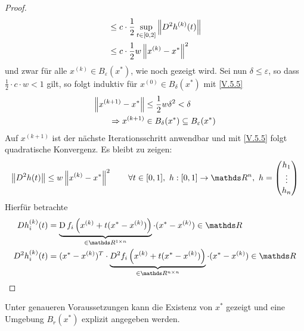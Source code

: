 \begin{proof}
\begin{align}
    &\leq c\cdot \frac{1}{2} \sup_{t\in[0,2]} \nn[D^2h^{(k)}(t)] \\
    & \leq c\cdot \frac{1}{2} w\nn[x^{(k)}-x^{*}]^2
      \label{V.5.5}
  \end{align}
  und zwar für alle $x^{(k)}\in B_\varepsilon(x^{*})$, 
  wie noch gezeigt wird.
  Sei nun $\delta \leq \varepsilon$, 
  so dass $\frac{1}{2} \cdot c\cdot w <1$ gilt,
  so folgt induktiv für $x^{(0)}\in B_\delta(x^{*})$ mit \eqref{V.5.5}
  \begin{align*}
    \nn[x^{(k+1)}-x^{*}] &\leq \frac{1}{2}w\delta^2 < \delta\\
    \Rightarrow x^{(k+1)}&\in B_\delta(x^{*})\subseteq B_\varepsilon(x^{*})
  \end{align*}
  Auf $x^{(k+1)} $ ist der nächste Iterationsschritt anwendbar
  und mit \eqref{V.5.5} folgt quadratische Konvergenz.
  Es bleibt zu zeigen:
  \begin{gather*}
    \nn[D^2h(t)] \leq w\nn[x^{(k)}-x^{*}]^2 \qquad \forall t\in [0,1],~
    h:[0,1]\rightarrow\Ren,~ h=\begin{pmatrix} h_1 \\ \vdots \\ h_n \end{pmatrix}
  \end{gather*}
  Hierfür betrachte
  \begin{align*}
    Dh_i^{(k)}(t)
    &=\underbrace{
      \D f_i\left( x^{(k)}+t(x^{*}-x^{(k)})\right)
      }_{\in \R^{1\times n}}
      \cdot (x^{*}-x^{(k)})\in\R\\
    D^2h_i^{(k)}(t)
    &=(x^{*}-x^{(k)})^T\cdot
      \underbrace{
      D^2f_i\left( x^{(k)}+t(x^{*}-x^{(k)})\right)
      }_{\in \R^{n\times n}}
      \cdot (x^{*}-x^{(k)})\in\R\\
  \end{align*}
\end{proof}

Unter genaueren Voraussetzungen kann die Existenz von $x^{*}$ gezeigt 
und eine Umgebung $B_r(x^{*})$ explizit angegeben werden.

